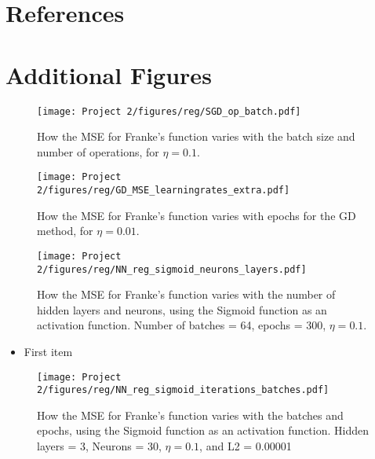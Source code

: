 \documentclass[english,notitlepage,reprint,nofootinbib]{revtex4-2}  %
\begin{document}
\section*{References}
\printbibliography[heading=none]
\newpage
\appendix

\section{Additional Figures}\label{app: figs}

\begin{figure}[h!]
    \centering %
    \texttt{[image: Project 2/figures/reg/SGD\_op\_batch.pdf]} 
    \caption{How the MSE for Franke's function varies with the batch size and number of operations, for $\eta=0.1$. }
    \label{fig: a3}
\end{figure}

\begin{figure}[h!]
    \centering %
    \texttt{[image: Project 2/figures/reg/GD\_MSE\_learningrates\_extra.pdf]} 
    \caption{How the MSE for Franke's function varies with epochs for the GD method, for $\eta=0.01$.}
    \label{fig: extra1}
\end{figure}

\begin{figure}[h!]
    \centering %
    \texttt{[image: Project 2/figures/reg/NN\_reg\_sigmoid\_neurons\_layers.pdf]} 
    \caption{How the MSE for Franke's function varies with the number of hidden layers and neurons, using the Sigmoid function as an activation function. 
    Number of batches = 64, epochs = 300,  $\eta=0.1$.
    }
    \label{fig: b_sigmoid_1}
\end{figure}

\begin{itemize}
\color{white}
\item First item
\end{itemize}

\begin{figure}[h!]
    \centering %
    \texttt{[image: Project 2/figures/reg/NN\_reg\_sigmoid\_iterations\_batches.pdf]} 
    \caption{How the MSE for Franke's function varies with the batches and epochs, using the Sigmoid function as an activation function. 
    Hidden layers = 3, Neurons = 30, $\eta=0.1$, and L2 = 0.00001}
    \label{fig: b_sigmoid_2}
\end{figure}
\end{document}
